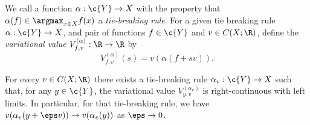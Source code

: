 \documentclass[preprint,12pt]{colt2025}
\begin{document}
\begin{definition}
We call a function $\alpha:\c{Y}\to X$ with the property that $\alpha(f)\in \argmax_{x\in X} f(x)$ a \emph{tie-breaking rule}.
For a given tie breaking rule $\alpha:\c{Y}\to X$, and pair of functions $f\in\c{Y}$ and $v\in C(X; \R)$, define the \emph{variational value} $V^{(\alpha)}_{f,v}:\R \to \R$ by
\[
V^{(\alpha)}_{f,v}(s) = v(\alpha(f+sv)). 
\]
\end{definition}

\begin{lemma}
\label{lem:envelope_cont}
For every $v\in C(X; \R)$ there exists a tie-breaking rule  $\alpha_v:\c{Y}\to X$ such that, for any $y\in\c{Y}$, the variational value $V^{(\alpha_v)}_{y,v}$ is right-continuous with left limits.
In particular, for that tie-breaking rule, we have $v(\alpha_v(y+\eps v)) \to v(\alpha_v(y))$ as $\eps\to 0$.
\end{lemma}
\end{document}
